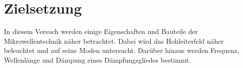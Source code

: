 \section{Zielsetzung}
\label{sec:Zielsetzung}

In diesem Versuch werden einige Eigenschaften und Bauteile der Mikrowellentechnik näher betrachtet. 
Dabei wird das Hohleiterfeld näher beleuchtet und auf seine Moden untersucht. 
Darüber hinaus werden Frequenz, Wellenlänge und Dämpung eines Dämpfungsgliedes bestimmt.
